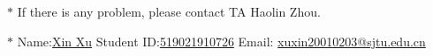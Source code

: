 \documentclass[12pt,a4paper]{article}
\theoremstyle{definition}
\begin{document}
\noindent

\noindent{}


\begin{center}
\footnotesize{\color{red}$*$ If there is any problem, please contact TA Haolin Zhou.}\par
\footnotesize{\color{blue}$*$ Name:\underline{Xin Xu}  \quad Student ID:\underline{519021910726} \quad Email: \underline{xuxin20010203@sjtu.edu.cn}}
\end{center}
\end{document}
